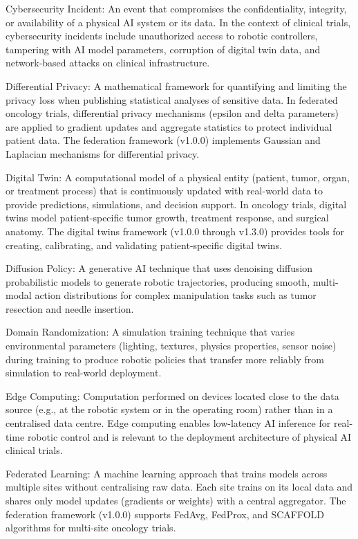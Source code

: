 Cybersecurity Incident: An event that compromises the confidentiality, integrity, or availability of a physical AI system or its data. In the context of clinical trials, cybersecurity incidents include unauthorized access to robotic controllers, tampering with AI model parameters, corruption of digital twin data, and network-based attacks on clinical infrastructure.

Differential Privacy: A mathematical framework for quantifying and limiting the privacy loss when publishing statistical analyses of sensitive data. In federated oncology trials, differential privacy mechanisms (epsilon and delta parameters) are applied to gradient updates and aggregate statistics to protect individual patient data. The federation framework (v1.0.0) implements Gaussian and Laplacian mechanisms for differential privacy.

Digital Twin: A computational model of a physical entity (patient, tumor, organ, or treatment process) that is continuously updated with real-world data to provide predictions, simulations, and decision support. In oncology trials, digital twins model patient-specific tumor growth, treatment response, and surgical anatomy. The digital twins framework (v1.0.0 through v1.3.0) provides tools for creating, calibrating, and validating patient-specific digital twins.

Diffusion Policy: A generative AI technique that uses denoising diffusion probabilistic models to generate robotic trajectories, producing smooth, multi-modal action distributions for complex manipulation tasks such as tumor resection and needle insertion.

Domain Randomization: A simulation training technique that varies environmental parameters (lighting, textures, physics properties, sensor noise) during training to produce robotic policies that transfer more reliably from simulation to real-world deployment.

Edge Computing: Computation performed on devices located close to the data source (e.g., at the robotic system or in the operating room) rather than in a centralised data centre. Edge computing enables low-latency AI inference for real-time robotic control and is relevant to the deployment architecture of physical AI clinical trials.

Federated Learning: A machine learning approach that trains models across multiple sites without centralising raw data. Each site trains on its local data and shares only model updates (gradients or weights) with a central aggregator. The federation framework (v1.0.0) supports FedAvg, FedProx, and SCAFFOLD algorithms for multi-site oncology trials.


